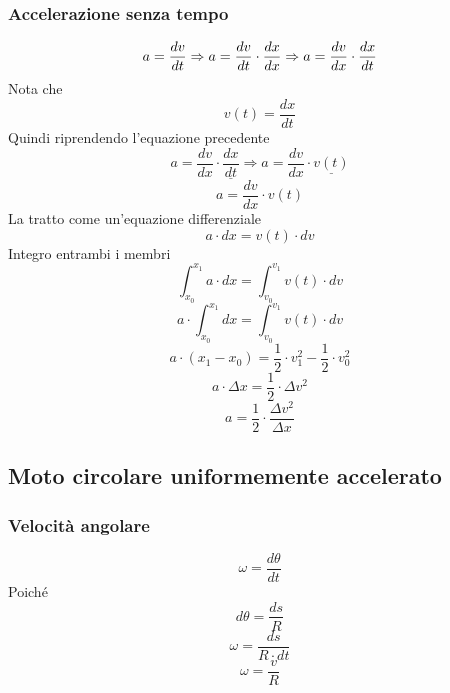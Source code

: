 \documentclass[twoside]{article}
\begin{document}
\subsubsection{Accelerazione senza tempo}
\begin{equation*}
  a = \frac{dv}{dt} \Rightarrow a = \frac{dv}{dt} \cdot \frac{dx}{dx} \Rightarrow a = \frac{dv}{dx} \cdot \frac{dx}{dt} \\
\end{equation*}
Nota che
\begin{equation*}
  v(t) = \frac{dx}{dt}
\end{equation*}
Quindi riprendendo l’equazione precedente
\begin{equation*}
  a = \frac{dv}{dx} \cdot \underline{\frac{dx}{dt}} \Rightarrow a =  \frac{dv}{dx} \cdot \underline{v(t)}
\end{equation*}
\begin{equation*}
  a =  \frac{dv}{dx} \cdot v(t)
\end{equation*}
La tratto come un'equazione differenziale
\begin{equation*}
  a \cdot dx = v(t) \cdot dv
\end{equation*}
Integro entrambi i membri
\begin{equation*}
  \int_{x_0}^{x_1} a \cdot dx = \int_{v_0}^{v_1} v(t) \cdot dv
\end{equation*}
\begin{equation*}
  a \cdot \int_{x_0}^{x_1} dx = \int_{v_0}^{v_1} v(t) \cdot dv
\end{equation*}
\begin{equation*}
  a \cdot (x_1 - x_0) = \frac{1}{2} \cdot v_1^2 - \frac{1}{2} \cdot v_0^2
\end{equation*}
\begin{equation*}
  a \cdot \Delta x = \frac{1}{2} \cdot \Delta v^2
\end{equation*}
\begin{equation}
  \boxed{a = \frac{1}{2} \cdot \frac{\Delta v^2}{\Delta x}}
  \label{eq:accelerazione_senza_tempo}
\end{equation}

\subsection{Moto circolare uniformemente accelerato}
\subsubsection{Velocità angolare}
\begin{equation}
  \boxed{\omega = \frac{d\theta}{dt}}
\end{equation}
Poiché
\begin{equation*}
  d \theta = \frac{ds}{R}
\end{equation*}
\begin{equation*}
  \omega = \frac{ds}{R \cdot dt}
\end{equation*}
\begin{equation}
  \boxed{\omega = \frac{v}{R}}
\end{equation}
\end{document}
